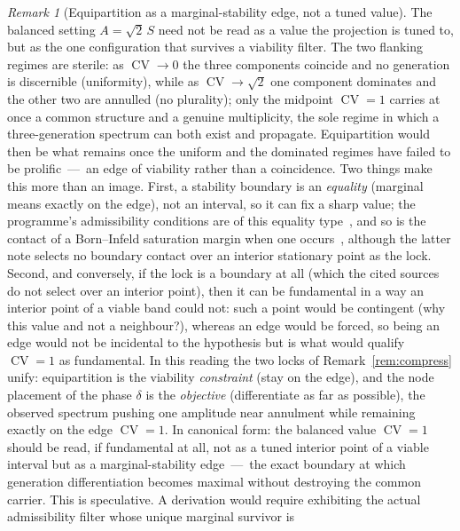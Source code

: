 \documentclass[11pt]{article}
\theoremstyle{definition}
\theoremstyle{remark}
\newtheorem{remark}{Remark}
\newcommand{\CV}{\operatorname{CV}}
\begin{document}
    \begin{remark}[Equipartition as a marginal-stability edge, not a tuned value]
      \label{rem:edge}
      The balanced setting $A = \sqrt2\,S$ need not be read as a value the projection is tuned to, but as the one
      configuration that survives a viability filter.
      The two flanking regimes are sterile: as $\CV \to 0$ the three components coincide and no generation is
      discernible (uniformity), while as $\CV \to \sqrt2$ one component dominates and the other two are annulled (no
      plurality); only the midpoint $\CV = 1$ carries at once a common structure and a genuine multiplicity, the sole
      regime in which a three-generation spectrum can both exist and propagate.
      Equipartition would then be what remains once the uniform and the dominated regimes have failed to be
      prolific~---~an edge of viability rather than a coincidence.
      Two things make this more than an image.
      First, a stability boundary is an \emph{equality} (marginal means exactly on the edge), not an interval, so it
      can fix a sharp value; the programme's admissibility conditions are of this equality type~\cite{Beau2026l}, and so
      is the contact of a Born--Infeld saturation margin when one occurs~\cite{Beau2026bim}, although the latter note
      selects no boundary contact over an interior stationary point as the lock.
      Second, and conversely, if the lock is a boundary at all (which the cited sources do not select over an interior point), then it
      can be fundamental in a way an interior point of a viable band could not: such a point would be contingent (why
      this value and not a neighbour?), whereas an edge would be forced, so being an edge would not be incidental
      to the hypothesis but is what would qualify $\CV = 1$ as fundamental.
      In this reading the two locks of Remark~\ref{rem:compress} unify: equipartition is the viability
      \emph{constraint} (stay on the edge), and the node placement of the phase $\delta$ is the \emph{objective}
      (differentiate as far as possible), the observed spectrum pushing one amplitude near annulment while remaining
      exactly on the edge $\CV = 1$.
      In canonical form: the balanced value $\CV = 1$ should be read, if fundamental at all, not as a tuned interior
      point of a viable interval but as a marginal-stability edge~---~the exact boundary at which generation
      differentiation becomes maximal without destroying the common carrier.
      This is speculative.
      A derivation would require exhibiting the actual admissibility filter whose unique marginal survivor is

\end{remark}
\end{document}
